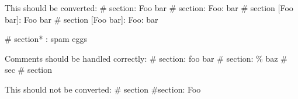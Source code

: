 This should be converted:
# section: Foo bar
# section: Foo: bar
# section [Foo bar]: Foo bar
# section [Foo\: bar]: Foo: bar

# section* : spam eggs

Comments should be handled correctly:
# section: foo bar %
# section: \% baz %
# sec%
# section %

This should not be converted:
# section
#section: Foo
